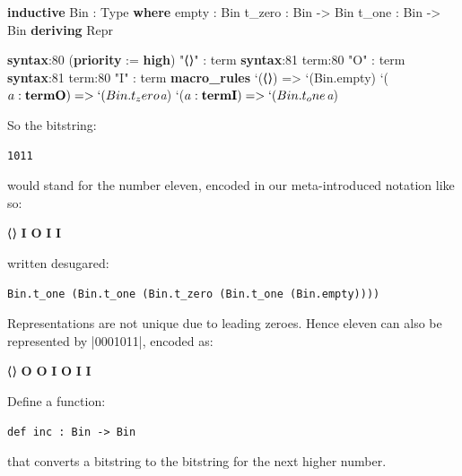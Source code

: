 \documentclass{memoir}
\newcommand{\coloredwave}[2]{\textcolor{#1}{\uwave{\textcolor{black}{#2}}}}
\newcommand{\infoDecorate}[1]{\coloredwave{infoColor}{#1}}
\newcommand{\PLFASymbol}[1]{{\PLFASymbolFont #1}}
\begin{document}
\par
\begin{LeanVerbatim}
\textbf{inductive} Bin : Type \textbf{where}
     empty  : Bin
     t_zero : Bin -> Bin
     t_one  : Bin -> Bin
    \textbf{deriving} Repr

\textbf{syntax}:80 (\textbf{priority} := \textbf{high}) "\PLFASymbol{⟨}\PLFASymbol{⟩}" : term
\textbf{syntax}:81 term:80 "O" : term
\textbf{syntax}:81 term:80 "I" : term
\textbf{macro_rules}
   `(\PLFASymbol{⟨}\PLFASymbol{⟩})        => `(Bin.empty)
   `($\textit{a}:\textbf{term} \textbf{O}) => `(Bin.t_zero $\textit{a})
   `($\textit{a}:\textbf{term} \textbf{I}) => `(Bin.t_one $\textit{a})
\end{LeanVerbatim}

\par
\par\noindent So the bitstring:

\par
\begin{verbatim}
1011
\end{verbatim}

\par
\par\noindent would stand for the number eleven, encoded in our meta-introduced notation like so:\begin{LeanVerbatim}
\infoDecorate{\textbf{\symbol{35}eval}} \PLFASymbol{⟨}\PLFASymbol{⟩} \textbf{I} \textbf{O} \textbf{I} \textbf{I}
\end{LeanVerbatim}
written desugared:\begin{verbatim}
Bin.t_one (Bin.t_one (Bin.t_zero (Bin.t_one (Bin.empty))))
\end{verbatim}
Representations are not unique due to leading zeroes. Hence eleven can also be
represented by \LeanVerb|0001011|, encoded as:\begin{LeanVerbatim}
\infoDecorate{\textbf{\symbol{35}eval}} \PLFASymbol{⟨}\PLFASymbol{⟩} \textbf{O} \textbf{O} \textbf{I} \textbf{O} \textbf{I} \textbf{I}
\end{LeanVerbatim}
Define a function:\begin{verbatim}
def inc : Bin -> Bin
\end{verbatim}
that converts a bitstring to the bitstring for the next higher number.

\par

\clearpage

\par
\end{document}

